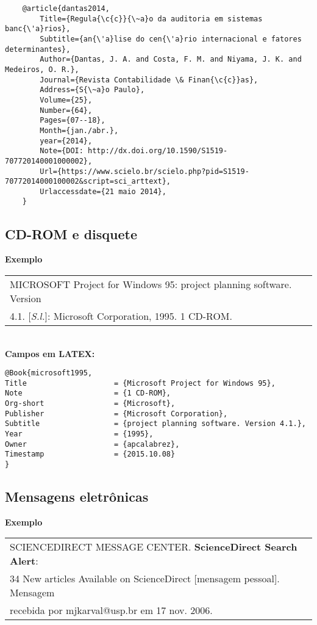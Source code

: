 \begin{verbatim}
	@article{dantas2014,
		Title={Regula{\c{c}}{\~a}o da auditoria em sistemas banc{\'a}rios},
		Subtitle={an{\'a}lise do cen{\'a}rio internacional e fatores determinantes},
		Author={Dantas, J. A. and Costa, F. M. and Niyama, J. K. and Medeiros, O. R.},
		Journal={Revista Contabilidade \& Finan{\c{c}}as},
		Address={S{\~a}o Paulo},
		Volume={25},
		Number={64},
		Pages={07--18},
		Month={jan./abr.},
		year={2014},
		Note={DOI: http://dx.doi.org/10.1590/S1519-707720140001000002},
		Url={https://www.scielo.br/scielo.php?pid=S1519-70772014000100002&script=sci_arttext},
		Urlaccessdate={21 maio 2014},	
	}
\end{verbatim}


\subsection{CD-ROM e disquete}

\textbf{Exemplo} \\

\begin{tabular}{|l|c|} \hline
	MICROSOFT Project for Windows 95: project planning software. Version \\4.1. [\textit{S.l.}]: Microsoft Corporation, 1995. 1 CD-ROM. 
	\\\hline
\end{tabular} \\

\textbf{Campos em LATEX:} 

\begin{verbatim}
@Book{microsoft1995,
Title                    = {Microsoft Project for Windows 95},
Note                     = {1 CD-ROM},
Org-short                = {Microsoft},
Publisher                = {Microsoft Corporation},
Subtitle                 = {project planning software. Version 4.1.},
Year                     = {1995},
Owner                    = {apcalabrez},
Timestamp                = {2015.10.08}
}
\end{verbatim}

\subsection{Mensagens eletr\^onicas}

\textbf{Exemplo} \\

\begin{tabular}{|l|c|} \hline
	SCIENCEDIRECT MESSAGE CENTER. \textbf{ScienceDirect Search Alert}: \\34 New articles Available on ScienceDirect [mensagem pessoal]. Mensagem \\recebida por mjkarval@usp.br em 17 nov. 2006. 
	\\\hline
\end{tabular} \\

